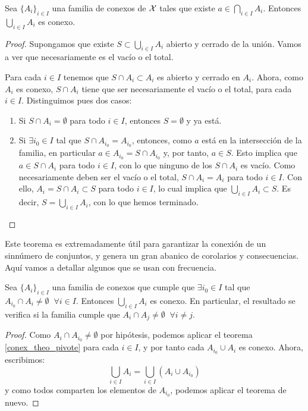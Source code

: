 \begin{theo}
	\label{conex_theo_pivote}
	Sea $\{A_i\}_{i\in I}$ una familia de conexos de $\mathcal{X}$ tales que existe $a\in\bigcap_{i\in I} A_i$. Entonces $\bigcup_{i\in I} A_i$ es conexo.
\end{theo}
\begin{proof}
	Supongamos que existe $S\subset\bigcup_{i\in I} A_i$ abierto y cerrado de la unión. Vamos a ver que necesariamente es el vacío o el total.
	
	Para cada $i\in I$ tenemos que $S\cap A_i\subset A_i$ es abierto y cerrado en $A_i$. Ahora, como $A_i$ es conexo, $S\cap A_i$ tiene que ser necesariamente el vacío o el total, para cada $i\in I$. Distinguimos pues dos casos:
	\begin{enumerate}
		\item Si $S\cap A_i=\emptyset$ para todo $i\in I$, entonces $S=\emptyset$ y ya está.
		\item Si $\exists i_0\in I$ tal que $S\cap A_{i_0}=A_{i_0}$, entonces, como $a$ está en la intersección de la familia, en particular $a\in A_{i_0}= S\cap A_{i_0}$ y, por tanto, $a\in S$. Esto implica que $a\in S\cap A_i$ para todo $i\in I$, con lo que ninguno de los $S\cap A_i$ es vacío. Como necesariamente deben ser el vacío o el total, $S\cap A_i=A_i$ para todo $i\in I$. Con ello, $A_i=S\cap A_i\subset S$ para todo $i\in I$, lo cual implica que $\bigcup_{i\in I} A_i\subset S$. Es decir, $S=\bigcup_{i\in I} A_i$, con lo que hemos terminado.
	\end{enumerate}
\end{proof}

Este teorema es extremadamente útil para garantizar la conexión de un sinnúmero de conjuntos, y genera un gran abanico de corolarios y consecuencias. Aquí vamos a detallar algunos que se usan con frecuencia.

\begin{cor}
	\label{conex_cor_pivote_corte_comun}
	Sea $\{A_i\}_{i\in I}$ una familia de conexos que cumple que $\exists i_0\in I$ tal que $A_{i_0}\cap A_i\neq\emptyset\;\;\forall i\in I$. Entonces $\bigcup_{i\in I} A_i$ es conexo. En particular, el resultado se verifica si la familia cumple que $A_i\cap A_j\neq\emptyset\;\;\forall i\neq j$.
	
	\begin{proof}
		Como $A_i\cap A_{i_0}\neq\emptyset$ por hipótesis, podemos aplicar el teorema \ref{conex_theo_pivote} para cada $i\in I$, y por tanto cada $A_{i_0}\cup A_i$ es conexo. Ahora, escribimos:
		\[\bigcup_{i\in I} A_i = \bigcup_{i\in I} (A_i\cup A_{i_0})\]
		y como todos comparten los elementos de $A_{i_0}$, podemos aplicar el teorema de nuevo.
	\end{proof}
\end{cor}


